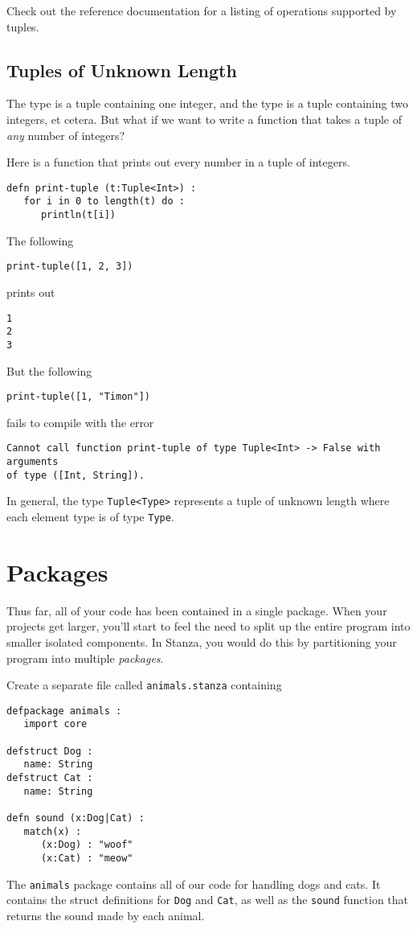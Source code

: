 \documentclass[10pt,oneside]{book}
\begin{document}
Check out the reference documentation for a listing of operations supported by tuples.

\subsection*{Tuples of Unknown Length}
The type \texttt{\frenchspacing [Int]} is a tuple containing one integer, and the type \texttt{} is a tuple containing two integers, et cetera. But what if we want to write a function that takes a tuple of {\em any} number of integers?

Here is a function that prints out every number in a tuple of integers.
\begin{lstlisting}
defn print-tuple (t:Tuple<Int>) :
   for i in 0 to length(t) do :
      println(t[i])
\end{lstlisting}

The following
\begin{lstlisting}
print-tuple([1, 2, 3])
\end{lstlisting}
prints out
\begin{lstlisting}
1
2
3
\end{lstlisting}

But the following
\begin{lstlisting}
print-tuple([1, "Timon"])
\end{lstlisting}
fails to compile with the error
\begin{lstlisting}
Cannot call function print-tuple of type Tuple<Int> -> False with arguments
of type ([Int, String]).
\end{lstlisting}

In general, the type \texttt{\frenchspacing Tuple<Type>}  represents a tuple of unknown length where each element type is of type \texttt{\frenchspacing Type}. 

\section{Packages}
Thus far, all of your code has been contained in a single package. When your projects get larger, you'll start to feel the need to split up the entire program into smaller isolated components. In Stanza, you would do this by partitioning your program into multiple {\em packages}. 

Create a separate file called \texttt{\frenchspacing animals.stanza} containing
\begin{lstlisting}
defpackage animals :
   import core

defstruct Dog :
   name: String
defstruct Cat :
   name: String

defn sound (x:Dog|Cat) :
   match(x) :
      (x:Dog) : "woof"
      (x:Cat) : "meow"
\end{lstlisting}
The \texttt{\frenchspacing animals} package contains all of our code for handling dogs and cats. It contains the struct definitions for \texttt{\frenchspacing Dog} and \texttt{\frenchspacing Cat}, as well as the \texttt{\frenchspacing sound} function that returns the sound made by each animal.
\end{document}
